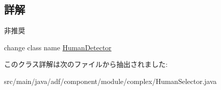 \subsection{詳解}
\begin{DoxyRefDesc}{非推奨}
\item[\hyperlink{deprecated__deprecated000014}{非推奨}]change class name \hyperlink{classadf_1_1component_1_1module_1_1complex_1_1HumanDetector}{Human\+Detector} \end{DoxyRefDesc}


このクラス詳解は次のファイルから抽出されました\+:\begin{DoxyCompactItemize}
\item 
src/main/java/adf/component/module/complex/Human\+Selector.\+java\end{DoxyCompactItemize}
